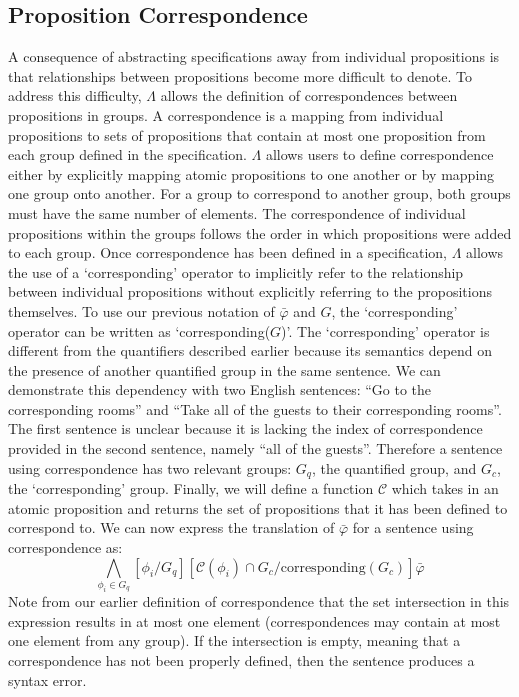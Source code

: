 \subsection{Proposition Correspondence} 
A consequence of abstracting specifications away from individual propositions is that relationships between propositions become more difficult to denote. 
To address this difficulty, $\Lambda$ allows the definition of correspondences between propositions in groups. 
A correspondence is a mapping from individual propositions to sets of propositions that contain at most one proposition from each group defined in the specification. 
$\Lambda$ allows users to define correspondence either by explicitly mapping atomic propositions to one another or by mapping one group onto another. 
For a group to correspond to another group, both groups must have the same number of elements. 
The correspondence of individual propositions within the groups follows the order in which propositions were added to each group. 
Once correspondence has been defined in a specification, $\Lambda$ allows the use of a `corresponding' operator to implicitly refer to the relationship between individual propositions without explicitly referring to the propositions themselves. 
To use our previous notation of $\bar{\varphi}$ and $G$, the `corresponding' operator can be written as `corresponding($G$)'. 
The `corresponding' operator is different from the quantifiers described earlier because its semantics depend on the presence of another quantified group in the same sentence. 
We can demonstrate this dependency with two English sentences: ``Go to the corresponding rooms'' and ``Take all of the guests to their corresponding rooms''.
The first sentence is unclear because it is lacking the index of correspondence provided in the second sentence, namely ``all of the guests''. 
Therefore a sentence using correspondence has two relevant groups: $G_q$, the quantified group, and $G_c$, the `corresponding' group. 
Finally, we will define a function $\mathcal{C}$ which takes in an atomic proposition and returns the set of propositions that it has been defined to correspond to. 
We can now express the translation of $\bar{\varphi}$ for a sentence using correspondence as:
\begin{equation*}
	\bigwedge \limits_{\phi_i \in G_q} [\phi_i / G_q] [\mathcal{C}(\phi_i) \cap G_c / \text{corresponding}(G_c)] \bar{\varphi}
\end{equation*}
Note from our earlier definition of correspondence that the set intersection in this expression results in at most one element (correspondences may contain at most one element from any group). 
If the intersection is empty, meaning that a correspondence has not been properly defined, then the sentence produces a syntax error. 

